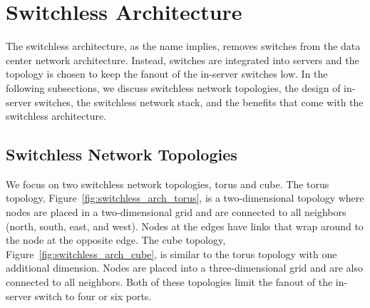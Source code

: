 \vspace{-0.1in}
\section{Switchless Architecture}
\label{sec:arch}

The switchless architecture, as the name implies, removes switches from the data center network architecture.  Instead, switches are integrated into servers and the topology is chosen to keep the fanout of the in-server switches low.  In the following subsections, we discuss switchless network topologies, the design of in-server switches, the switchless network stack, and the benefits that come with the switchless architecture.


\subsection{Switchless Network Topologies}

We focus on two switchless network topologies, torus and cube.  The torus topology, Figure~\ref{fig:switchless_arch_torus}, is a two-dimensional topology where nodes are placed in a two-dimensional grid and are connected to all neighbors (north, south, east, and west).  Nodes at the edges have links that wrap around to the node at the opposite edge. The cube topology, Figure~\ref{fig:switchless_arch_cube}, is similar to the torus topology with one additional dimension.  Nodes are placed into a three-dimensional grid and are also connected to all neighbors.  Both of these topologies limit the fanout of the in-server switch to four or six ports.



